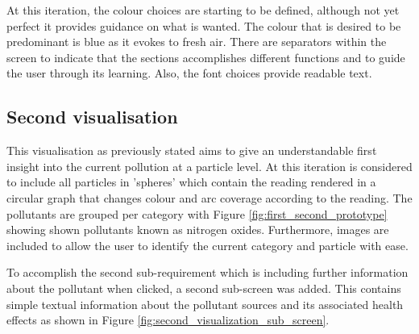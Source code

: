 At this iteration, the colour choices are starting to be defined, although not yet perfect it provides guidance on what is wanted. The colour that is desired to be predominant is blue as it evokes to fresh air. There are separators within the screen to indicate that the sections accomplishes different functions and to guide the user through its learning. Also, the font choices provide readable text. 

\subsection{Second visualisation}
This visualisation as previously stated aims to give an understandable first insight into the current pollution at a particle level. At this iteration is considered to include all particles in 'spheres' which contain the reading rendered in a circular graph that changes colour and arc coverage according to the reading. The pollutants are grouped per category with Figure \ref{fig:first_second_prototype} showing shown pollutants known as nitrogen oxides. Furthermore, images are included to allow the user to identify the current category and particle with ease.

To accomplish the second sub-requirement which is including further information about the pollutant when clicked, a second sub-screen was added. This contains simple textual information about the pollutant sources and its associated health effects as shown in Figure \ref{fig:second_visualization_sub_screen}. 

